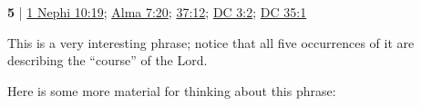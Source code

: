 	\begin{compactdesc}
	
		\item[one eternal round] \textbf{5} | \hyperref[1NEPHI-10-19]{1 Nephi 10:19}; \hyperref[ALMA-7-20]{Alma 7:20}; \hyperref[ALMA-37-12]{37:12}; \hyperref[DC3-2]{DC 3:2}; \hyperref[DC35-1]{DC 35:1}
			\begin{compactdesc}
				\item[Commentary] This is a very interesting phrase; notice that all five occurrences of it are describing the ``course'' of the Lord.
				
					Here is some more material for thinking about this phrase:
					

\end{compactdesc}
\end{compactdesc}

